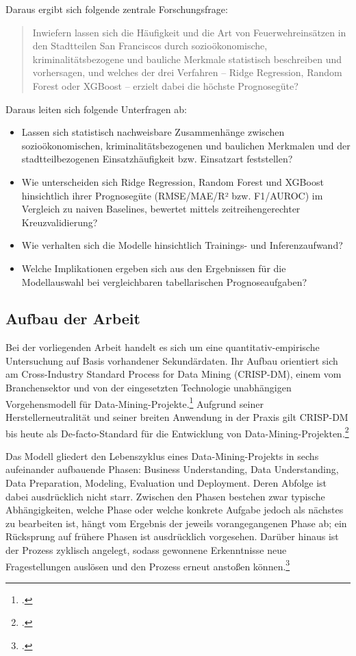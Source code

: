\documentclass[12pt,a4paper]{article}
\begin{document}
Daraus ergibt sich folgende zentrale Forschungsfrage:

\begin{quote}
Inwiefern lassen sich die Häufigkeit und die Art von Feuerwehreinsätzen in den Stadtteilen
San Franciscos durch sozioökonomische, kriminalitätsbezogene und bauliche Merkmale statistisch
beschreiben und vorhersagen, und welches der drei Verfahren -- Ridge Regression, Random Forest
oder XGBoost -- erzielt dabei die höchste Prognosegüte?
\end{quote}

Daraus leiten sich folgende Unterfragen ab:

\begin{itemize}[leftmargin=*, itemsep=2pt]
  \item Lassen sich statistisch nachweisbare Zusammenhänge zwischen sozioökonomischen,
        kriminalitätsbezogenen und baulichen Merkmalen und der stadtteilbezogenen
        Einsatzhäufigkeit bzw. Einsatzart feststellen?
  \item Wie unterscheiden sich Ridge Regression, Random Forest und XGBoost hinsichtlich ihrer
        Prognosegüte (RMSE/MAE/R² bzw. F1/AUROC) im Vergleich zu naiven Baselines, bewertet
        mittels zeitreihengerechter Kreuzvalidierung?
  \item Wie verhalten sich die Modelle hinsichtlich Trainings- und Inferenzaufwand?
  \item Welche Implikationen ergeben sich aus den Ergebnissen für die Modellauswahl bei
        vergleichbaren tabellarischen Prognoseaufgaben?
\end{itemize}

\subsection{Aufbau der Arbeit}
Bei der vorliegenden Arbeit handelt es sich um eine quantitativ-empirische Untersuchung auf Basis
vorhandener Sekundärdaten. Ihr Aufbau orientiert sich am Cross-Industry Standard Process for Data
Mining (CRISP-DM), einem vom Branchensektor und von der eingesetzten Technologie unabhängigen
Vorgehensmodell für Data-Mining-Projekte.\footcite{Wirth2000} Aufgrund seiner Herstellerneutralität
und seiner breiten Anwendung in der Praxis gilt CRISP-DM bis heute als De-facto-Standard für die
Entwicklung von Data-Mining-Projekten.\footcite[5]{Marban2009}

Das Modell gliedert den Lebenszyklus eines Data-Mining-Projekts in sechs aufeinander aufbauende
Phasen: Business Understanding, Data Understanding, Data Preparation, Modeling, Evaluation und
Deployment. Deren Abfolge ist dabei ausdrücklich nicht starr. Zwischen den Phasen bestehen zwar
typische Abhängigkeiten, welche Phase oder welche konkrete Aufgabe jedoch als nächstes zu
bearbeiten ist, hängt vom Ergebnis der jeweils vorangegangenen Phase ab; ein Rücksprung auf frühere
Phasen ist ausdrücklich vorgesehen. Darüber hinaus ist der Prozess zyklisch angelegt, sodass
gewonnene Erkenntnisse neue Fragestellungen auslösen und den Prozess erneut anstoßen
können.\footcite{Wirth2000}
\end{document}
